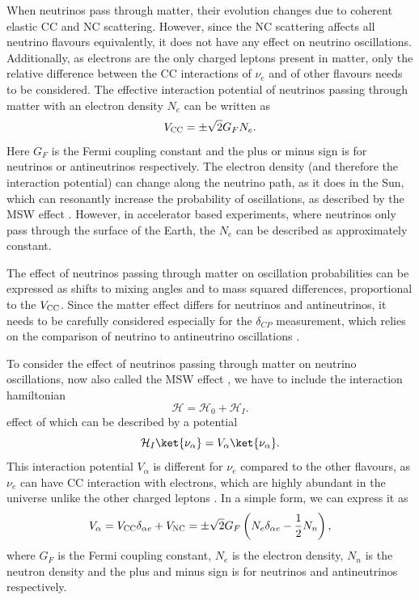 When neutrinos pass through matter, their evolution changes due to coherent elastic \gls{CC} and \gls{NC} scattering. However, since the \gls{NC} scattering affects all neutrino flavours equivalently, it does not have any effect on neutrino oscillations. Additionally, as electrons are the only charged leptons present in matter, only the relative difference between the \gls{CC} interactions of $\nu_e$ and of other flavours needs to be considered. The effective interaction potential of neutrinos passing through matter with an electron density $N_e$ can be written as
\begin{equation}
V_{\textsc{CC}}=\pm\sqrt{2}G_{F}N_{e}.
\end{equation}
Here $G_F$ is the Fermi coupling constant and the plus or minus sign is for neutrinos or antineutrinos respectively. The electron density (and therefore the interaction potential) can change along the neutrino path, as it does in the Sun, which can resonantly increase the probability of oscillations, as described by the \gls{MSW} effect \cite{Wolfenstein78.pdf, MikheyevSmirnov85.pdf}. However, in accelerator based experiments, where neutrinos only pass through the surface of the Earth, the $N_e$ can be described as approximately constant.

The effect of neutrinos passing through matter on oscillation probabilities can be expressed as shifts to mixing angles and to mass squared differences, proportional to the $V_{\textsc{CC}}$. Since the matter effect differs for neutrinos and antineutrinos, it needs to be carefully considered especially for the $\delta_{CP}$ measurement, which relies on the comparison of neutrino to antineutrino oscillations \cite{FundamentalsOfNeutrinoPhysics.pdf}.

\iffalse
To consider the effect of neutrinos passing through matter on neutrino oscillations, now also called the \gls{MSW} effect \cite{Wolfenstein78.pdf, MikheyevSmirnov85.pdf}, we have to include the interaction hamiltonian
\begin{equation}
\mathcal{H}=\mathcal{H}_0+\mathcal{H}_I.
\end{equation}
effect of which can be described by a potential
\begin{equation}
\mathcal{H}_I\ket{\nu_\alpha}=V_\alpha\ket{\nu_\alpha}.
\end{equation}
This interaction potential $V_\alpha$ is different for $\nu_e$ compared to the other flavours, as $\nu_e$ can have \gls{CC} interaction with electrons, which are highly abundant in the universe unlike the other charged leptons \cite{FundamentalsOfNeutrinoPhysics.pdf}. In a simple form, we can express it as
\begin{equation}
V_\alpha=V_{\textsc{CC}}\delta_{\alpha e}+V_{\textsc{NC}}=
\pm\sqrt{2}G_{F}\left(N_{e}\delta_{\alpha e}-\frac{1}{2}N_n\right),
\end{equation}
where $G_F$ is the Fermi coupling constant, $N_e$ is the electron density, $N_n$ is the neutron density and the plus and minus sign is for neutrinos and antineutrinos respectively.

